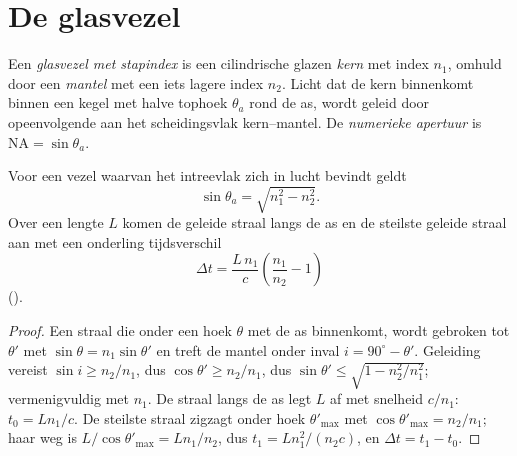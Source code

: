 \section{De glasvezel}

\begin{definition}[Stapindexvezel]\label{def:b1:rays-reflection-refraction:fiber}
Een \emph{glasvezel met stapindex} is een cilindrische glazen \emph{kern} met
index $n_1$, omhuld door een \emph{mantel} met een iets lagere index $n_2$.
Licht dat de kern binnenkomt binnen een kegel met halve tophoek $\theta_a$
rond de as, wordt geleid door opeenvolgende  aan het
scheidingsvlak kern--mantel. De \emph{numerieke apertuur} is
$\mathrm{NA} = \sin\theta_a$.
\end{definition}

\begin{proposition}\label{prop:b1:rays-reflection-refraction:fiber}
Voor een vezel waarvan het intreevlak zich in lucht bevindt geldt
\[
\sin\theta_a = \sqrt{n_1^2 - n_2^2} .
\]
Over een lengte $L$ komen de geleide straal langs de as en de steilste
geleide straal aan met een onderling tijdsverschil
\[
\Delta t = \frac{L\,n_1}{c}\left(\frac{n_1}{n_2} - 1\right)
\]
(\emph{}).
\end{proposition}

\begin{proof}
Een straal die onder een hoek $\theta$ met de as binnenkomt, wordt gebroken tot
$\theta'$ met $\sin\theta = n_1\sin\theta'$ en treft de mantel onder inval
$i = 90^\circ - \theta'$. Geleiding vereist $\sin i \geq n_2/n_1$, dus
$\cos\theta' \geq n_2/n_1$, dus $\sin\theta' \leq
\sqrt{1 - n_2^2/n_1^2}$; vermenigvuldig met $n_1$. De straal langs de as legt
$L$ af met snelheid $c/n_1$: $t_0 = Ln_1/c$. De steilste straal zigzagt onder
hoek $\theta'_{\max}$ met $\cos\theta'_{\max} = n_2/n_1$; haar weg is
$L/\cos\theta'_{\max} = L n_1/n_2$, dus $t_1 = L n_1^2/(n_2 c)$, en
$\Delta t = t_1 - t_0$.
\end{proof}

